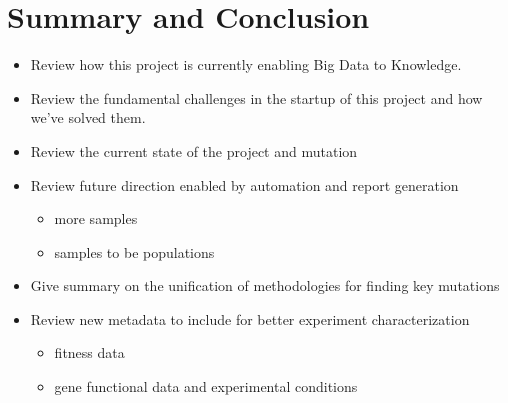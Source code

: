 \documentclass[12pt,final,masters,chapterheads]{ucsd}  %
\begin{document}

\chapter{Summary and Conclusion}
\begin{itemize}
\item Review how this project is currently enabling Big Data to Knowledge.
\item Review the fundamental challenges in the startup of this project and how we've solved them.
\item Review the current state of the project and mutation
\item Review future direction enabled by automation and report generation
\begin{itemize}
\item more samples
\item samples to be populations
\end{itemize}
\item Give summary on the unification of methodologies for finding key mutations
\item Review new metadata to include for better experiment characterization
\begin{itemize}
\item fitness data
\item gene functional data and experimental conditions
\end{itemize}
\end{itemize}
\end{document}
